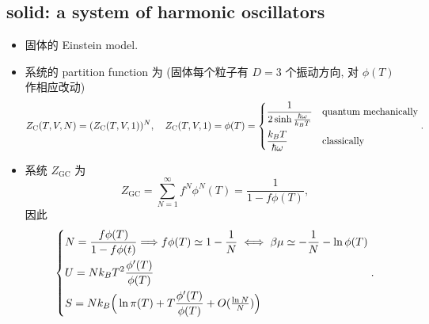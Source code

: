 \subsection{solid: a system of harmonic oscillators}
\begin{itemize}
	\item 固体的 Einstein model.
	
	\item 系统的 partition function 为 (固体每个粒子有 $D = 3$ 个振动方向, 对 $\phi(T)$ 作相应改动)
	\begin{equation}
		Z_\text{C}(T, V, N) = (Z_\text{C}(T, V, 1))^N, \quad Z_\text{C}(T, V, 1) = \phi(T) = \begin{dcases}
			\frac{1}{2 \sinh \frac{\hbar \omega}{k_B T}} & \text{quantum mechanically} \\
			\frac{k_B T}{\hbar \omega} & \text{classically}
		\end{dcases}.
	\end{equation}
	
	\item 系统 $Z_\text{GC}$ 为
	\begin{equation}
		Z_\text{GC} = \sum_{N = 1}^\infty f^N \phi^N(T) = \frac{1}{1 - f \phi(T)},
	\end{equation}
	因此
	\begin{equation} \label{4.5.7}
		\begin{dcases}
			N = \frac{f \phi(T)}{1 - f \phi(t)} \Longrightarrow f \phi(T) \simeq 1 - \frac{1}{N} \iff \beta \mu \simeq - \frac{1}{N} - \ln \phi(T) \\
			U = N k_B T^2 \frac{\phi'(T)}{\phi(T)} \\
			S = N k_B \Big( \ln \pi(T) + T \frac{\phi'(T)}{\phi(T)} + O({\textstyle \frac{\ln N}{N}}) \Big)
		\end{dcases}.
	\end{equation}
\end{itemize}

